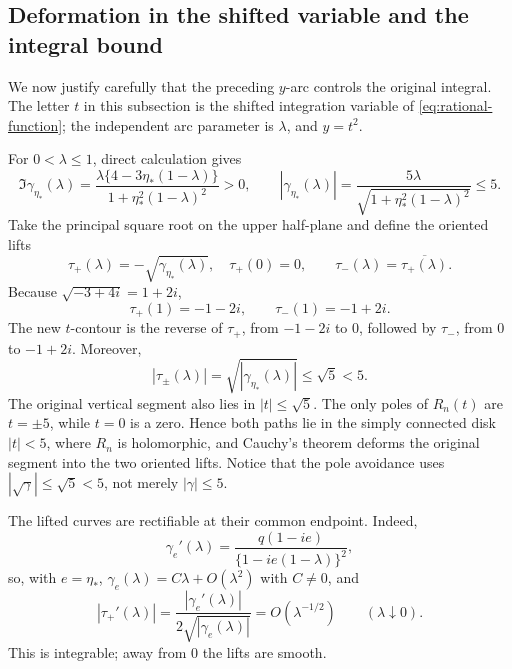 \documentclass[11pt,reqno,letterpaper]{amsart}
\numberwithin{equation}{section}
\theoremstyle{definition}
\theoremstyle{remark}
\begin{document}
\subsection{Deformation in the shifted variable and the integral bound}

We now justify carefully that the preceding \(y\)-arc controls the
original integral.  The letter \(t\) in this subsection is the shifted
integration variable of \eqref{eq:rational-function}; the independent
arc parameter is \(\lambda\), and \(y=t^2\).

For \(0<\lambda\leq1\), direct calculation gives
\begin{equation}\label{eq:arc-geometry}
 \Im\gamma_{\eta_*}(\lambda)
 =\frac{\lambda\{4-3\eta_*(1-\lambda)\}}
 {1+\eta_*^2(1-\lambda)^2}>0,
 \qquad
 |\gamma_{\eta_*}(\lambda)|
 =\frac{5\lambda}{\sqrt{1+\eta_*^2(1-\lambda)^2}}\leq5.
\end{equation}
Take the principal square root on the upper half-plane and define the
oriented lifts
\begin{equation}\label{eq:square-root-lifts}
 \tau_+(\lambda)=-\sqrt{\gamma_{\eta_*}(\lambda)},
 \quad \tau_+(0)=0,
 \qquad
 \tau_-(\lambda)=\overline{\tau_+(\lambda)}.
\end{equation}
Because \(\sqrt{-3+4i}=1+2i\),
\[
 \tau_+(1)=-1-2i,\qquad \tau_-(1)=-1+2i.
\]
The new \(t\)-contour is the reverse of \(\tau_+\), from
\(-1-2i\) to \(0\), followed by \(\tau_-\), from \(0\) to
\(-1+2i\).  Moreover,
\begin{equation}\label{eq:lift-radius}
 |\tau_\pm(\lambda)|
 =\sqrt{|\gamma_{\eta_*}(\lambda)|}\leq\sqrt5<5.
\end{equation}
The original vertical segment also lies in \(|t|\leq\sqrt5\).  The only
poles of \(R_n(t)\) are \(t=\pm5\), while \(t=0\) is a zero.  Hence both
paths lie in the simply connected disk \(|t|<5\), where \(R_n\) is
holomorphic, and Cauchy's theorem deforms the original segment into the
two oriented lifts.  Notice that the pole avoidance uses
\(|\sqrt\gamma|\leq\sqrt5<5\), not merely \(|\gamma|\leq5\).

The lifted curves are rectifiable at their common endpoint.  Indeed,
\begin{equation}\label{eq:gamma-derivative-origin}
 \gamma_e'(\lambda)
 =\frac{q(1-ie)}{\{1-ie(1-\lambda)\}^2},
\end{equation}
so, with \(e=\eta_*\),
\(\gamma_e(\lambda)=C\lambda+O(\lambda^2)\) with \(C\ne0\), and
\[
 |\tau_+'(\lambda)|
 =\frac{|\gamma_e'(\lambda)|}{2\sqrt{|\gamma_e(\lambda)|}}
 =O(\lambda^{-1/2})
 \qquad(\lambda\downarrow0).
\]
This is integrable; away from \(0\) the lifts are smooth.
\end{document}
